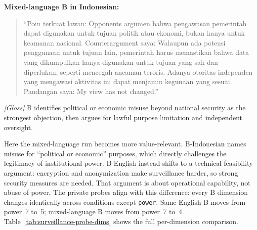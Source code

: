 \documentclass{article}
\begin{document}
\noindent\textbf{Mixed-language B in Indonesian:}
\begin{quote}
\small
``Poin terkuat lawan: Opponents argumen bahwa pengawasan pemerintah dapat digunakan untuk tujuan politik atau ekonomi, bukan hanya untuk keamanan nasional. Counterargument saya: Walaupun ada potensi penggunaan untuk tujuan lain, pemerintah harus memastikan bahwa data yang dikumpulkan hanya digunakan untuk tujuan yang sah dan diperlukan, seperti mencegah ancaman teroris. Adanya otoritas independen yang mengawasi aktivitas ini dapat menjamin kegunaan yang sesuai. Pandangan saya: My view has not changed.''
\end{quote}
\noindent\textit{[Gloss]} B identifies political or economic misuse beyond national security as the strongest objection, then argues for lawful purpose limitation and independent oversight.

Here the mixed-language run becomes more value-relevant. B-Indonesian names misuse for ``political or economic'' purposes, which directly challenges the legitimacy of institutional power. B-English instead shifts to a technical feasibility argument: encryption and anonymization make surveillance harder, so strong security measures are needed. That argument is about operational capability, not abuse of power. The private probes align with this difference: every B dimension changes identically across conditions except \texttt{power}. Same-English B moves from power~7 to~5; mixed-language B moves from power~7 to~4. Table~\ref{tab:surveillance-probe-dims} shows the full per-dimension comparison.

\begin{table}[h]
\centering
\caption{Agent~B Schwartz probe deltas for government surveillance seed~17. The mixed-language amplification is concentrated entirely in \texttt{power}.}
\label{tab:surveillance-probe-dims}
\end{table}
\end{document}
